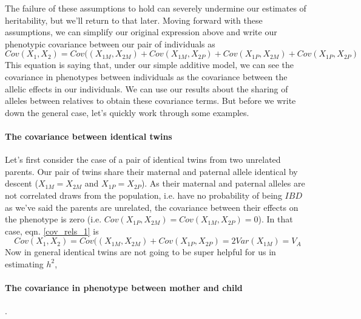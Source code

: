 The failure of these assumptions
to hold can severely undermine our estimates of heritability, but we'll
return to that later. Moving forward with these assumptions, we can
simplify our original expression above and write our phenotypic covariance between our pair of individuals as
\begin{equation}
Cov(X_1,X_2) =
Cov((X_{1M},X_{2M})+Cov(X_{1M},X_{2P})+Cov(X_{1P},X_{2M})
+Cov(X_{1P},X_{2P}) \label{cov_rels_1}
\end{equation}
This equation is saying that, under our simple additive model, we can see the
covariance in phenotypes between individuals as the covariance between
the  allelic effects in our individuals. We can use our results about
the sharing of alleles between relatives to obtain these covariance terms.
But before we write down the general case, let's quickly work through some
examples. \\


\paragraph{The covariance between identical twins}
Let's first consider the case of a pair of identical twins from two
unrelated parents. Our pair of twins share their maternal and paternal
allele identical by descent ($X_{1M}=X_{2M}$ and $X_{1P}=X_{2P}$). As their maternal and
paternal alleles are not correlated draws from the population,
i.e. have no probability of being $IBD$ as we've said the parents are unrelated, the
covariance between their effects on the phenotype is zero  
(i.e. $Cov(X_{1P},X_{2M})=Cov(X_{1M},X_{2P})=0$). In that case,
eqn. \ref{cov_rels_1} is
\begin{equation}
Cov(X_1,X_2) = Cov((X_{1M},X_{2M})+Cov(X_{1P},X_{2P}) = 2Var(X_{1M})
= V_A
\end{equation}
Now in general identical twins are not going to be super helpful for
us in estimating $h^2$, \\

\paragraph{The covariance in phenotype between mother and child}.


